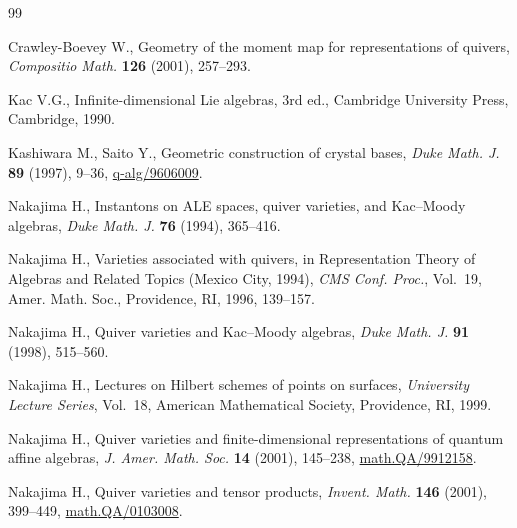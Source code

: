 \documentclass[10pt,a4paper]{amsart}
\theoremstyle{definition}
\numberwithin{equation}{section}
\begin{document}
%
\begin{thebibliography}{99}

Crawley-Boevey W., Geometry of the moment map for representations of
  quivers, {\it Compositio Math.} \textbf{126} (2001),   257--293.


 Kac V.G., Inf\/inite-dimensional Lie algebras, 3rd ed., Cambridge
  University Press, Cambridge, 1990. %


Kashiwara M., Saito Y., Geometric construction of crystal bases, {\it Duke
  Math. J.} \textbf{89} (1997),  9--36,  \mbox{\href{http://arxiv.org/abs/q-alg/9606009}{q-alg/9606009}}. %


Nakajima H., Instantons on {ALE} spaces, quiver varieties, and
  Kac--Moody algebras, {\it Duke Math. J.} \textbf{76} (1994), 365--416.


Nakajima H., Varieties associated with quivers, in Representation Theory of
  Algebras and Related Topics (Mexico City, 1994), {\it CMS Conf. Proc.}, Vol.~19,
  Amer. Math. Soc., Providence, RI, 1996, 139--157.


Nakajima H., Quiver varieties and Kac--Moody algebras, {\it Duke Math. J.}
  \textbf{91} (1998), 515--560. %


Nakajima H., Lectures on Hilbert schemes of points on surfaces, {\it University
  Lecture Series}, Vol.~18, American Mathematical Society, Providence, RI, 1999.


Nakajima H., Quiver varieties and f\/inite-dimensional representations of
  quantum af\/f\/ine algebras, {\it J. Amer. Math. Soc.} \textbf{14} (2001),
  145--238, \href{http://arxiv.org/abs/math.QA/9912158}{math.QA/9912158}. %


Nakajima H., Quiver varieties and tensor products, {\it Invent. Math.}
  \textbf{146} (2001), 399--449, \href{http://arxiv.org/abs/math.QA/0103008}{math.QA/0103008}. %



\end{thebibliography}
\end{document}
